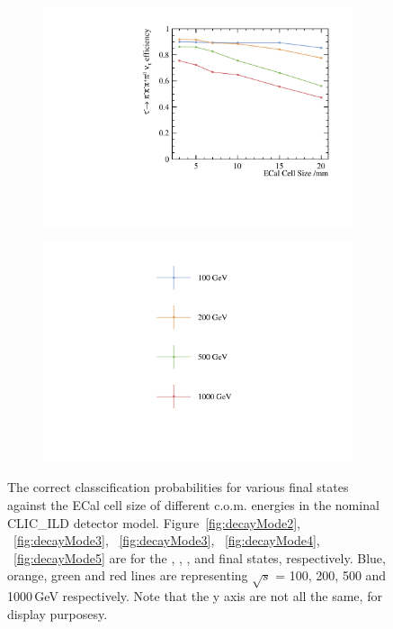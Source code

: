 \documentclass[a4paper,11pt]{article}
\newcommand{\decayPion}{\PGpm\PGnGt}
\newcommand{\decayRho}{\PGrP{\PGpm\PGpz}\PGnGt}
\newcommand{\decayAiPhoton}{\PaDoP{\PGpm\PGpz\PGpz}\PGnGt}
\newcommand{\decayAiPion}{\PaDoP{\PGpm\PGpm\PGpp}\PGnGt}
\newcommand{\decayThreePionPhoton}{\PGpm\PGpm\PGpp\PGpz\PGnGt}
\newcommand{\rootS}{\ensuremath{\sqrt{s}} }
\begin{document}
\begin{figure}[htbp]
\begin{subfigure}[b]{0.45\textwidth}
  \includegraphics[width=\textwidth]{plots/decayMode6}
  \caption{}
  \label{fig:decayMode6}
\end{subfigure}
\hfill
\begin{subfigure}[b]{0.45\textwidth}
  \includegraphics[width=\textwidth]{plots/legend}
\end{subfigure}

\caption{\label{fig:pion_efficiency} The correct classcification probabilities for various final states against the ECal cell size of different c.o.m. energies in the nominal CLIC\_ILD detector model. Figure~\ref{fig:decayMode2}, ~\ref{fig:decayMode3}, ~\ref{fig:decayMode3}, ~\ref{fig:decayMode4}, ~\ref{fig:decayMode5} are for the \decayPion, \decayRho,  \decayAiPhoton, \decayAiPion  and \decayThreePionPhoton  final states, respectively. Blue, orange, green and red lines are representing  \rootS = 100, 200, 500 and 1000\,GeV respectively. Note that the y axis are not all the same, for display purposesy.}
\end{figure}
\end{document}
